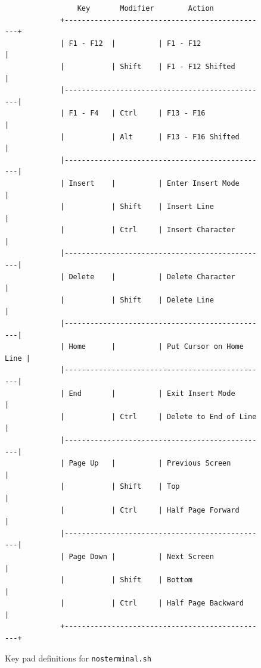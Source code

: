 \documentclass[a4paper,twoside,11pt]{article}
\begin{document}
\begin{figure}
\begin{verbatim}
                 Key       Modifier        Action                             
             +------------------------------------------------+               
             | F1 - F12  |          | F1 - F12                |               
             |           | Shift    | F1 - F12 Shifted        |               
             |------------------------------------------------|               
             | F1 - F4   | Ctrl     | F13 - F16               |              
             |           | Alt      | F13 - F16 Shifted       |               
             |------------------------------------------------|               
             | Insert    |          | Enter Insert Mode       |              
             |           | Shift    | Insert Line             |               
             |           | Ctrl     | Insert Character        |               
             |------------------------------------------------|               
             | Delete    |          | Delete Character        |               
             |           | Shift    | Delete Line             |               
             |------------------------------------------------|               
             | Home      |          | Put Cursor on Home Line |               
             |------------------------------------------------|               
             | End       |          | Exit Insert Mode        |              
             |           | Ctrl     | Delete to End of Line   |              
             |------------------------------------------------|               
             | Page Up   |          | Previous Screen         |               
             |           | Shift    | Top                     |               
             |           | Ctrl     | Half Page Forward       |              
             |------------------------------------------------|               
             | Page Down |          | Next Screen             |               
             |           | Shift    | Bottom                  |              
             |           | Ctrl     | Half Page Backward      |               
             +------------------------------------------------+   
	\end{verbatim}
	\caption{Key pad definitions for \texttt{nosterminal.sh}}
	\label{fig:nost}
\end{figure}
\end{document}
